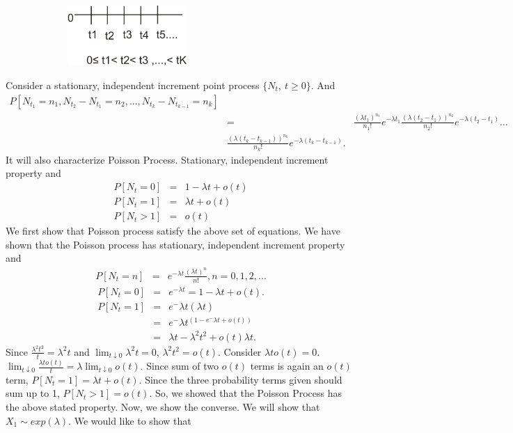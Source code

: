 \documentclass[11 pt]{article}
\theoremstyle{plain}
\theoremstyle{definition}
\theoremstyle{remark}
\begin{document}
\begin{figure}[h!]
\center
  \includegraphics[width=2.8in, height=0.9in]{SPQT.png}\\
\end{figure}
\noindent Consider a stationary, independent increment point process $\{N_t,~t\geq 0\}$. And  \\
\begin{eqnarray*}
  P[N_{t_{1}}= n_{1},N_{t_{2}}-N_{t_{1}}= n_{2},..., N_{t_{k}}-N_{t_{k-1}} =n_{k}] \\
   &=& \frac{(\lambda t_1)^{n_{1}}}{n_1!} e^{-\lambda t_{1}} \frac{(\lambda(t_{2}-t_{1}))^{n_{2}}}{n_{2}!} e^{-\lambda (t_{2}-t_{1})} \hdots\\
   & \frac{(\lambda(t_{k}-t_{k-1}))^{n_k}}{n_{k}!} e^{-\lambda (t_{k}-t_{k-1})}.
\end{eqnarray*}
\noindent It will also characterize Poisson Process. Stationary, independent increment property and\\
\begin{eqnarray*}\label{eqn1}
P[N_{t}=0] &=& 1-\lambda t + o(t) \\
  P[N_{t}=1] &=& \lambda t + o(t) \\
  P[N_{t}>1] &=& o(t)
\end{eqnarray*}
We first show that Poisson process satisfy the above set of equations. We have shown that the Poisson process has stationary, independent increment property  and 
\begin{eqnarray*}
  P[N_t= n] &=&  e^{-\lambda t} \frac{(\lambda t)^{n}}{n!}, n=0,1,2,...
  \end{eqnarray*}
  \begin{eqnarray*}
  P[N_{t}=0] &=& e^{-\lambda t} = 1-\lambda t + o(t).\\
   P[N_{t}=1]&=& e^-\lambda t (\lambda t) \\
  &=& e^-\lambda t^{(1-e^-\lambda t+ o(t))}\\
   &=& \lambda t- \lambda^{2} t^{2}+ o(t) \lambda t.
   \end{eqnarray*}
   Since $\frac{\lambda^{2} t^{2}}{t} =  \lambda^{2} t$ and $\lim _{t\downarrow 0}\lambda^{2} t= 0$, $\lambda^{2} t^{2} =o(t)$. Consider  $\lambda t o(t) = 0$.   $\lim _{t\downarrow 0}\frac{\lambda t o(t)}{t} = \lambda \lim _{t\downarrow 0} o(t)$. Since sum of two $o(t)$ terms is again an $o(t)$ term, $P[N_{t}=1]= \lambda t + o(t)$. Since the three probability terms given should sum up to 1, $ P[N_{t}>1]=o(t)$. So, we showed that the  Poisson Process has the above stated property. Now, we show the converse. We will show that $X_{1}\sim exp (\lambda )$. We would like to show that\\
\end{document}
